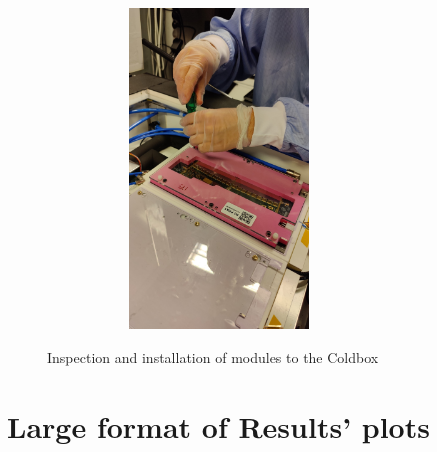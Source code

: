 \begin{figure}[h]
    \begin{subfigure}[b]{0.4\textwidth}
        \centering
        \includegraphics[width=7cm,height=8.5cm,keepaspectratio]{Figures/test/installation-1.jpg}
        \caption{}\label{fig:data}
    \end{subfigure}
    \caption{Inspection and installation of modules to the Coldbox}
    \label{fig:installation}
\end{figure}

\newpage
\section{Large format of Results' plots}

